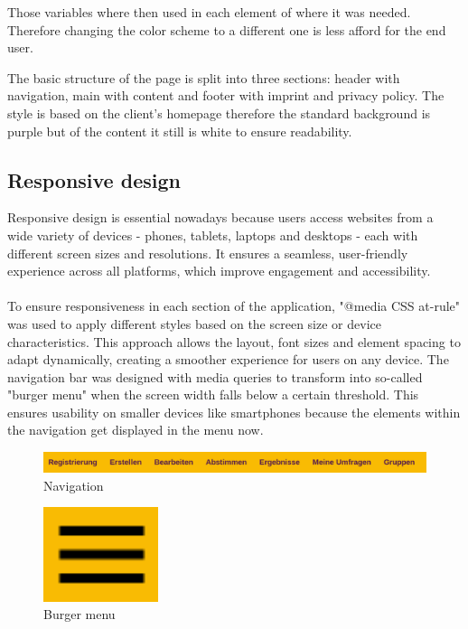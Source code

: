\documentclass[a4paper,12pt]{report}
\begin{document}
Those variables where then used in each element of where it was needed. Therefore changing the color scheme to a different one is less afford for the end user.

The basic structure of the page is split into three sections: header with navigation, main with content and footer with imprint and privacy policy. The style is based on the client's homepage therefore the standard background is purple but of the content it still is white to ensure readability. \parencite{lmppage}

\subsection{Responsive design}
Responsive design is essential nowadays because users access websites from a wide variety of devices - phones, tablets, laptops and desktops - each with different screen sizes and resolutions. It ensures a seamless, user-friendly experience across all platforms, which improve engagement and accessibility.\\ \\
To ensure responsiveness in each section of the application, "@media CSS at-rule" was used to apply different styles based on the screen size or device characteristics. This approach allows the layout, font sizes and element spacing to adapt dynamically, creating a smoother experience for users on any device. The navigation bar was designed with media queries to transform into so-called "burger menu" when the screen width falls below a certain threshold. This ensures usability on smaller devices like smartphones because the elements within the navigation get displayed in the menu now.
\begin{figure}[h!]
	\centering
	\includegraphics[width=1\textwidth]{pics/navigation.png}
	\caption{Navigation}
	\label{fig:navigation}
\end{figure}
\begin{figure}[H]
	\centering
	\includegraphics[width=0.3\textwidth]{pics/burger_menu.png}
	\caption{Burger menu}
	\label{fig:burger_menu}
\end{figure}
\end{document}
